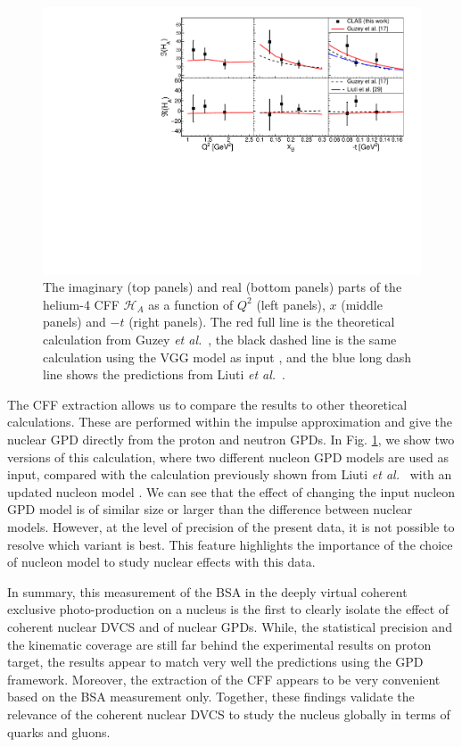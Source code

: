 \documentclass[aps,prc,preprint,superscriptaddress]{revtex4}
\begin{document}
\begin{figure}[tbp!]
\center
\includegraphics[width=14cm]{fig3/Coherent_CFF.pdf}
	\caption{The imaginary (top panels) and real (bottom panels) parts of the helium-4
	CFF $\mathcal{H}_A$ as a function of $Q^2$ (left panels), $x$ (middle panels) and 
	$-t$ (right panels). The red full line is the theoretical calculation from 
	Guzey {\it et al.}~\cite{Guzey:2003jh,Guzey:2008th}, the black dashed line is the same calculation 
	using the VGG model as input \cite{Vanderhaeghen:1999xj,Guidal:2004nd}, and
	the blue long dash line shows the predictions from Liuti {\it et 
	al.}~\cite{Liuti:2005gi,GonzalezHernandez:2012jv}.} 
\label{fig:CohCFF}
\end{figure}

The CFF extraction allows us to compare the results to other theoretical calculations.
These are performed within the impulse approximation \cite{Guzey:2003jh,Guzey:2008th} 
and give the nuclear GPD directly from the proton and neutron GPDs. In 
Fig. \ref{fig:CohCFF}, we show two versions of this calculation, where two different nucleon GPD
models are used as input, compared with the calculation previously shown from Liuti 
{\it et al.}~\cite{Liuti:2005gi} with an updated nucleon model \cite{GonzalezHernandez:2012jv}.
We can see that the effect of changing the input nucleon GPD model
is of similar size or larger than the difference between nuclear 
models. However, at the level of precision of the present data,
it is not possible to resolve which variant is best. This feature highlights the 
importance of the choice of nucleon model to study nuclear effects with this data.

In summary, this measurement of the BSA in the deeply virtual coherent exclusive 
photo-production on a nucleus is the first to clearly isolate the effect of 
coherent nuclear DVCS and of nuclear GPDs. While, the statistical precision and 
the kinematic coverage are still far behind the experimental results on
proton target, the results appear to match very well the predictions using the GPD 
framework. Moreover, the extraction of the CFF appears to be very convenient based
on the BSA measurement only. Together, these findings  validate the relevance of the 
coherent nuclear DVCS to study the nucleus globally in terms of quarks and 
gluons. 
\end{document}
